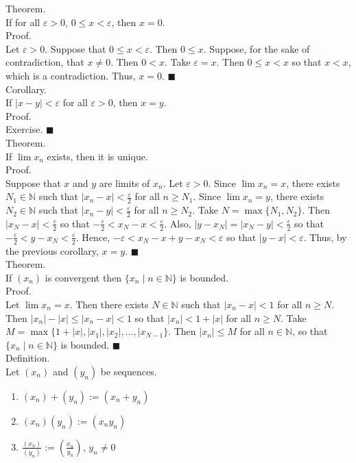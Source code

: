 \documentclass[twocolumn]{article}
\newcommand{\qed}{$\blacksquare$}
\newcommand{\br}{\vspace{\baselineskip}}
\let\eps\varepsilon
\newcommand{\naturals}{\mathbb{N}}
\begin{document}
Theorem. \\
If for all $\eps > 0$, $0 \leq x < \eps$, then $x = 0$. \\
Proof. \\
Let $\eps > 0$. Suppose that $0 \leq x < \eps$. Then $0 \leq x$. Suppose, for the sake of contradiction, that $x \neq 0$. Then $0 < x$. Take $\eps = x$. Then $0 \leq x < x$ so that $x < x$, which is a contradiction. Thus, $x = 0$. \qed \\

Corollary. \\
If $|x - y| < \eps$ for all $\eps > 0$, then $x = y$. \\
Proof. \\
Exercise. \qed \\

Theorem. \\
If $\lim x_n$ exists, then it is unique. \\
Proof. \\
Suppose that $x$ and $y$ are limits of $x_n$. Let $\eps > 0$. Since $\lim x_n = x$, there exists $N_1 \in \naturals$ such that $|x_n - x| < \frac{\eps}{2}$ for all $n \geq N_1$. Since $\lim x_n = y$, there exists $N_2 \in \naturals$ such that $|x_n - y| < \frac{\eps}{2}$ for all $n \geq N_2$. Take $N = \max \{ N_1, N_2 \}$. Then $|x_N - x| < \frac{\eps}{2}$ so that $-\frac{\eps}{2} < x_N - x < \frac{\eps}{2}$. Also, $|y - x_N| = |x_N - y| < \frac{\eps}{2}$ so that $-\frac{\eps}{2} < y - x_N < \frac{\eps}{2}$. Hence, $-\eps < x_N - x + y - x_N < \eps$ so that $|y - x| < \eps$. Thus, by the previous corollary, $x = y$. \qed \\

Theorem. \\
If $(x_n)$ is convergent then $\{ x_n \mid n \in \naturals \}$ is bounded. \\
Proof. \\
Let $\lim x_n = x$. Then there exists $N \in \naturals$ such that $|x_n - x| < 1$ for all $n \geq N$. Then $|x_n| - |x| \leq |x_n - x| < 1$ so that $|x_n| < 1 + |x|$ for all $n \geq N$. Take $M = \max \{ 1 + |x|, |x_1|, |x_2|, \ldots, |x_{N - 1} \}$. Then $|x_n| \leq M$ for all $n \in \naturals$, so that $\{ x_n \mid n \in \naturals \}$ is bounded. \qed \\

Definition. \\
Let $(x_n)$ and $(y_n)$ be sequences.
\begin{enumerate}
	\item
	$(x_n) + (y_n) := (x_n + y_n)$
	\item
	$(x_n)(y_n) := (x_ny_n)$
	\item
	$\frac{(x_n)}{(y_n)} := (\frac{x_n}{y_n})$, $y_n \neq 0$
\end{enumerate} \br
\end{document}
